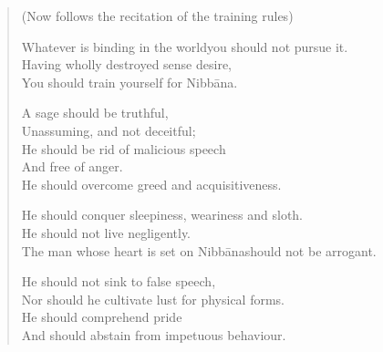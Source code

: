 \begin{verse}

(Now follows the recitation of the training rules)

 Whatever is binding in the world\newline you should not pursue it.\\
Having wholly destroyed sense desire,\\
You should train yourself for Nibbāna.


 A sage should be truthful,\\
Unassuming, and not deceitful;\\
He should be rid of malicious speech\\
And free of anger.\\
He should overcome greed and acquisitiveness.


 He should conquer sleepiness, weariness and sloth.\\
He should not live negligently.\\
The man whose heart is set on Nibbāna\newline should not be arrogant.


 He should not sink to false speech,\\
Nor should he cultivate lust for physical forms.\\
He should comprehend pride\\
And should abstain from impetuous behaviour.



\end{verse}
